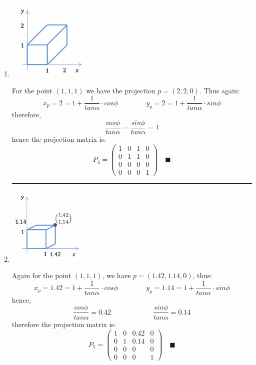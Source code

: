 \documentclass{article}
\newcommand{\proofend}{\quad\blacksquare}
\newcommand{\separator}{\vspace{.3cm}\begin{center}\noindent\rule{15cm}{0.4pt}\end{center}\vspace{.3cm}}
\newcommand{\twoColumns}[4]{
    \begin{minipage}{#1\linewidth}#3\end{minipage}
    \begin{minipage}{#2\linewidth}#4\end{minipage}
}
\begin{document}
\begin{enumerate}
        \newpage
        \item \twoColumns{0.25}{0.75}{
            \centering
            \includegraphics[width=4cm]{q3_4.png}
        }{
            For the point $(1,1,1)$ we have the projection $p=(2,2,0)$. Thus again:
            $$
                x_p = 2 = 1 + \dfrac{1}{tan\alpha}\cdot cos\phi\qquad\qquad
                y_p = 2 = 1 + \dfrac{1}{tan\alpha}\cdot sin\phi
            $$
            therefore,
            $$
                \dfrac{cos\phi}{tan\alpha} = \dfrac{sin\phi}{tan\alpha} = 1
            $$
            hence the projection matrix is:
            $$
                P_4 = \begin{pmatrix}
                    1&0&1&0\\
                    0&1&1&0\\
                    0&0&0&0\\
                    0&0&0&1
                \end{pmatrix}\proofend
            $$
        }
        \separator
        \item \twoColumns{0.25}{0.75}{
            \centering
            \includegraphics[width=4cm]{q3_5.png}
        }{
            Again for the point $(1,1,1)$, we have $p = (1.42, 1.14, 0)$, thus:
            $$
                x_p = 1.42 = 1 + \dfrac{1}{tan\alpha}\cdot cos\phi\qquad\qquad
                y_p = 1.14 = 1 + \dfrac{1}{tan\alpha}\cdot sin\phi
            $$
            hence,
            $$
                \dfrac{cos\phi}{tan\alpha} = 0.42\qquad\qquad\qquad
                \dfrac{sin\phi}{tan\alpha} = 0.14
            $$
            therefore the projection matrix is:
            $$
                P_5 = \begin{pmatrix}
                    1&0&0.42&0\\
                    0&1&0.14&0\\
                    0&0&0&0\\
                    0&0&0&1
                \end{pmatrix}\proofend
            $$
        }
    \end{enumerate}
\end{document}
